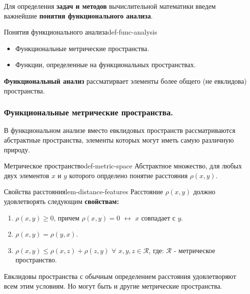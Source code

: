 \documentclass[14pt]{extarticle}
\begin{document}
        Для определения \textbf{задач и методов} вычислительной математики введем важнейшие \textbf{понятия функционального анализа}.

        \begin{definition}{Понятия функционального анализа}{def-func-analysis}
            \begin{itemize}
                \item Функциональные метрические пространства.
                \item Функции, определенные на функциональных пространствах.
            \end{itemize}
        \end{definition}

        \textbf{Функциональный анализ} рассматирвает элементы более общего (не евклидова) пространства.

    \subsubsection{Функциональные метрические пространства.}
        
        В функциональном анализе вместо евклидовых пространств рассматриваются абстрактные пространства, элементы которых могут иметь самую различную природу.

        \begin{definition}{Метрическое пространство}{def-metric-space}
            Абстрактное множество, для любых двух элементов $x$ и $y$ которого опрделено понятие расстояния $\rho(x, y)$.
        \end{definition}

        \begin{lemma}{Свойства расстояния}{lem-distance-features}
            Расстояние $\rho(x, y)$ должно удовлетворять следующим \textbf{свойствам:}
            \begin{enumerate}
                \item $\rho(x,y) \geq 0$, причем $\rho(x, y) = 0$ $\leftrightarrow$ $x$ совпадает с $y$.
                \item $\rho(x, y) = \rho(y, x)$.
                \item $\rho(x, y) \leq \rho(x, z) + \rho(z, y)$ $\forall$ $x, y, z \in \mathscr{R}$, где: $\mathscr{R}$ - метрическое пространство.
            \end{enumerate}
        \end{lemma}

        Евклидовы пространства с обычным определением расстояния удовлетворяют всем этим условиям. Но могут быть и другие метрические пространства.
\end{document}
